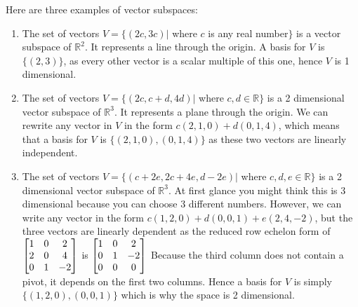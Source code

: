 \begin{example}Here are three examples of vector subspaces:
\begin{enumerate}
	\item 
The set of vectors $V=\{(2c,3c) |$ where $c$ is any real number$\}$ is a vector subspace of $\mathbb{R}^2$. It represents a line through the origin.  A basis for $V$ is $\{(2,3)\}$, as every other vector is a scalar multiple of this one, hence $V$ is 1 dimensional.
  \item
The set of vectors $V=\{(2c,c+d,4d)|$ where $c,d\in \mathbb{R}\}$ is a 2 dimensional vector subspace of $\mathbb{R}^3$. It represents a plane through the origin. We can rewrite any vector in $V$ in the form $c(2,1,0)+d(0,1,4)$, which means that a basis for $V$ is $\{(2,1,0),(0,1,4)\}$ as these two vectors are linearly independent.  
\item
The set of vectors $V=\{(c+2e,2c+4e,d-2e)|$ where $c,d,e\in \mathbb{R}\}$ is a 2 dimensional vector subspace of $\mathbb{R}^3$. At first glance you might think this is 3 dimensional because you can choose 3 different numbers.  However, we can write any vector in the form $c(1,2,0)+d(0,0,1)+e(2,4,-2)$, but the three vectors are linearly dependent as the reduced row echelon form of 
$
\begin{bmatrix}
\begin{matrix} 1\\2\\0 \end{matrix}&
\begin{matrix} 0\\0\\1 \end{matrix}&
\begin{matrix} 2\\4\\-2 \end{matrix}
\end{bmatrix}
$
is $
\begin{bmatrix}
\begin{matrix} 1\\0\\0 \end{matrix}&
\begin{matrix} 0\\1\\0 \end{matrix}&
\begin{matrix} 2\\-2\\0 \end{matrix}
\end{bmatrix}
$
Because the third column does not contain a pivot, it depends on the first two columns.  Hence a basis for $V$ is simply $\{(1,2,0),(0,0,1) \}$ which is why the space is 2 dimensional. 
\end{enumerate}
\end{example}
